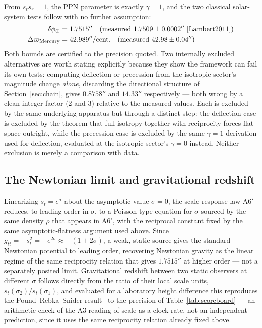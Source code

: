 \documentclass[pdflatex,sn-mathphys-num]{sn-jnl}
\theoremstyle{thmstyleone}
\theoremstyle{thmstylethree}
\theoremstyle{thmstyletwo}
\begin{document}
From $s_t s_r=1$, the PPN parameter is exactly $\gamma=1$, and the two
classical solar-system tests follow with no further assumption:
\begin{align}
\delta\phi_\odot &= 1.7515'' \quad(\text{measured } 1.7509\pm0.0002''\text{~\cite{Lambert2011}})\\
\Delta\varpi_{\text{Mercury}} &= 42.989''/\text{cent.}\quad(\text{measured } 42.98\pm0.04'')
\end{align}
Both bounds are certified to the precision quoted. Two internally
excluded alternatives are worth stating explicitly because they show the
framework can fail its own tests: computing deflection or precession
from the isotropic sector's magnitude change \emph{alone}, discarding the
directional structure of Section~\ref{sec:chain}, gives $0.8758''$ and
$14.33''$ respectively — both wrong by a clean integer factor (2 and 3)
relative to the measured values. Each is excluded by the same underlying
apparatus but through a distinct step: the deflection case is excluded
by the theorem that full isotropy together with reciprocity forces flat
space outright, while the precession case is excluded by the same
$\gamma=1$ derivation used for deflection, evaluated at the isotropic
sector's $\gamma=0$ instead. Neither exclusion is merely a comparison
with data.

\subsection{The Newtonian limit and gravitational redshift}

Linearizing $s_t = e^{\sigma}$ about the asymptotic value $\sigma=0$, the
scale response law A6$'$ reduces, to leading order in $\sigma$, to a
Poisson-type equation for $\sigma$ sourced by the same density $\rho$ that
appears in A6$'$, with the reciprocal constant fixed by the same
asymptotic-flatness argument used above. Since
$g_{tt}=-s_t^2=-e^{2\sigma}\approx -(1+2\sigma)$, a weak, static source
gives the standard Newtonian potential to leading order, recovering
Newtonian gravity as the linear regime of the same reciprocity relation
that gives $1.7515''$ at higher order — not a separately posited limit.
Gravitational redshift between two static observers at different $\sigma$
follows directly from the ratio of their local scale units,
$s_t(\sigma_2)/s_t(\sigma_1)$, and evaluated for a laboratory height
difference this reproduces the Pound--Rebka--Snider
result~\cite{PoundRebka1960,PoundSnider1965} to the precision of
Table~\ref{tab:scoreboard} — an arithmetic check of the A3 reading of
scale as a clock rate, not an independent prediction, since it uses the
same reciprocity relation already fixed above.
\end{document}
